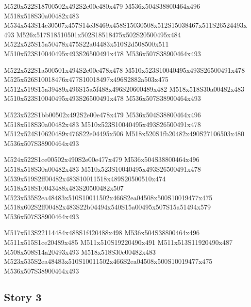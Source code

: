 \documentclass{article}
\begin{document}
\begin{multicols}{5}
\begin{center}
M520x522S18700502x492S2e00e480x479 %
M536x504S38800464x496 %
M518x518S30a00482x483 %
M534x543S14c30507x457S14c38469x458S15030508x512S15038467x511S26524493x493 %
M526x517S18510501x502S18518475x502S20500495x484 %
M522x525S15a50478x475S22a04483x510S2d508500x511 %
M510x523S10040495x493S26500491x478 %
M536x507S38900464x493 %
\vfil
\columnbreak

M522x522S1a500501x494S2e00e478x478 %
M510x523S10040495x493S26500491x478 %
M525x526S10018476x477S10018497x496S2882a503x475 %
M512x519S15a39489x496S15a5f488x496S20600489x482 %
M518x518S30a00482x483 %
M510x523S10040495x493S26500491x478 %
M536x507S38900464x493 %
\vfil
\columnbreak

M523x522S1bb00502x492S2e00e478x479 %
M536x504S38800464x496 %
M518x518S30a00482x483 %
M510x523S10040495x493S26500491x478 %
M512x524S10620489x476S22e04495x506 %
M518x520S1fb20482x490S27106503x480 %
M536x507S38900464x493 %
\vfil
\columnbreak

M524x522S1ce00502x490S2e00e477x479 %
M536x504S38800464x496 %
M518x518S30a00482x483 %
M510x523S10040495x493S26500491x478 %
M539x519S2ff00482x483S10011518x489S20500510x474 %
M518x518S10043488x483S20500482x507 %
M523x535S2ea48483x510S10011502x466S2ea04508x500S10019477x475 %
M518x602S2ff00482x483S22b04494x540S15a00495x507S15a51494x579 %
M536x507S38900464x493 %
\vfil
\columnbreak

M517x513S22114484x488S1f420488x498 %
M536x504S38800464x496 %
M511x515S1ce20489x485 %
M511x510S19220490x491 %
M511x513S11920490x487 %
M508x508S14a20493x493 %
M518x518S30c00482x483 %
M523x535S2ea48483x510S10011502x466S2ea04508x500S10019477x475 %
M536x507S38900464x493 %
\vfil

\end{center}
\end{multicols}

\subsection{Story 3}
\end{document}
